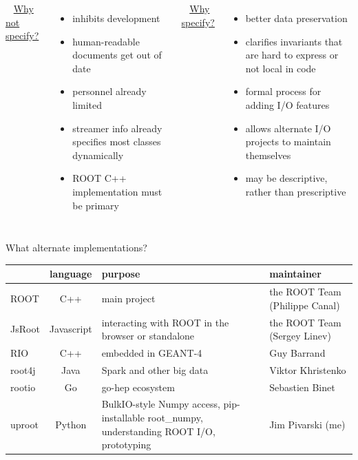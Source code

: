 \documentclass[aspectratio=169]{beamer}
\begin{document}
\begin{frame}{}
\vspace{1 cm}
\begin{columns}[t]
\mbox{ } \hfill \underline{\large Why not specify?} \hfill \mbox{ }

\vspace{0.25 cm}
\begin{itemize}
\item inhibits development
\item human-readable documents get out of date
\item personnel already limited
\item streamer info already specifies most classes dynamically
\item ROOT C++ implementation must be primary
\end{itemize}

\mbox{ } \hfill \underline{\large Why specify?} \hfill \mbox{ }

\vspace{0.25 cm}
\begin{itemize}
\item better data preservation
\item clarifies invariants that are hard to express or not local in code
\item formal process for adding I/O features
\item allows alternate I/O projects to maintain themselves
\item may be descriptive, rather than prescriptive
\end{itemize}

\end{columns}
\end{frame}

\begin{frame}{What alternate implementations?}
\begin{center}
\renewcommand{\arraystretch}{1.5}
\begin{tabular}{l c p{4.5 cm} l}
& language & purpose & maintainer \\\hline
ROOT & C++ & main project & the ROOT Team (Philippe Canal) \\
JsRoot & Javascript & interacting with ROOT in the browser or standalone & the ROOT Team (Sergey Linev) \\
RIO & C++ & embedded in GEANT-4 & Guy Barrand \\
root4j & Java & Spark and other big data & Viktor Khristenko \\
rootio & Go & go-hep ecosystem & Sebastien Binet \\
uproot & Python & BulkIO-style Numpy access, pip-installable root\_numpy, understanding ROOT I/O, prototyping & Jim Pivarski (me)
\end{tabular}
\end{center}
\end{frame}
\end{document}
